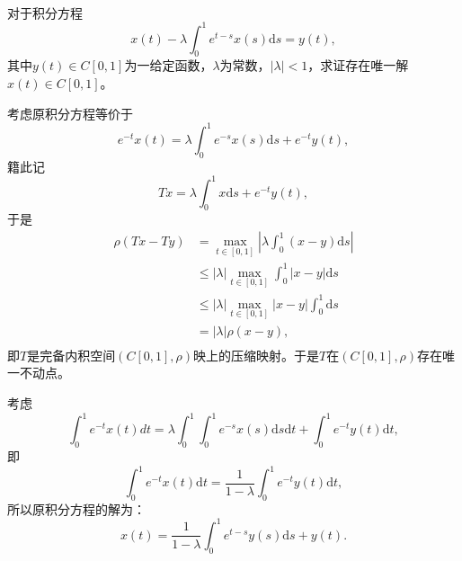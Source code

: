 \begin{exercise}
\hfill\\
对于积分方程
$$x(t)-\lambda\int_0^1e^{t-s}x(s)\mathrm{d}s=y(t),$$
其中$y(t)\in C[0,1]$为一给定函数，$\lambda$为常数，$|\lambda|<1$，求证存在唯一解$x(t)\in C[0,1]$。

考虑原积分方程等价于
$$e^{-t}x(t)=\lambda\int_0^1e^{-s}x(s)\mathrm{d}s+e^{-t}y(t),$$
籍此记
$$Tx=\lambda\int_0^1x\mathrm{d}s+e^{-t}y(t),$$
于是
\begin{align*}
\rho(Tx-Ty)&=\max_{t\in[0,1]}|\lambda\int_0^1(x-y)\mathrm{d}s|\\
&\leq|\lambda|\max_{t\in[0,1]}\int_0^1|x-y|\mathrm{d}s\\
&\leq|\lambda|\max_{t\in[0,1]}|x-y|\int_0^1\mathrm{d}s\\
&=|\lambda|\rho(x-y),\\
\end{align*}
即$T$是完备内积空间$(C[0,1],\rho)$映上的压缩映射。于是$T$在$(C[0,1],\rho)$存在唯一不动点。

考虑
$$\int_0^1e^{-t}x(t)dt=\lambda\int_0^1\int_0^1e^{-s}x(s)\mathrm{d}s\mathrm{d}t+\int_0^1e^{-t}y(t)\mathrm{d}t,$$
即
$$\int_0^1e^{-t}x(t)\mathrm{d}t=\frac{1}{1-\lambda}\int_0^1e^{-t}y(t)\mathrm{d}t,$$
所以原积分方程的解为：
$$x(t)=\frac{1}{1-\lambda}\int_0^1e^{t-s}y(s)\mathrm{d}s+y(t).$$
\end{exercise}
\hfill\\
